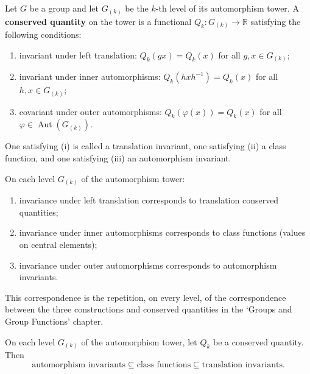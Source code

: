 \begin{definition}\label{def:higher_conservation_law}
Let $G$ be a group and let $G_{(k)}$ be the $k$-th level of its automorphism tower. A \textbf{conserved quantity} on the tower is a functional $Q_k: G_{(k)}\to \mathbb{R}$ satisfying the following conditions:
\begin{enumerate}[label=(\roman*)]
    \item invariant under left translation: $Q_k(gx)=Q_k(x)$ for all $g,x\in G_{(k)}$;
    \item invariant under inner automorphisms: $Q_k(hxh^{-1})=Q_k(x)$ for all $h,x\in G_{(k)}$;
    \item covariant under outer automorphisms: $Q_k(\varphi(x)) = Q_k(x)$ for all $\varphi\in\operatorname{Aut}(G_{(k)})$.
\end{enumerate}
One satisfying (i) is called a translation invariant, one satisfying (ii) a class function, and one satisfying (iii) an automorphism invariant.
\end{definition}

\begin{remark}\label{cor:higher_conservation}
On each level $G_{(k)}$ of the automorphism tower:
\begin{enumerate}[label=(\roman*)]
    \item invariance under left translation corresponds to translation conserved quantities;
    \item invariance under inner automorphisms corresponds to class functions (values on central elements);
    \item invariance under outer automorphisms corresponds to automorphism invariants.
\end{enumerate}
This correspondence is the repetition, on every level, of the correspondence between the three constructions and conserved quantities in the `Groups and Group Functions' chapter.
\end{remark}

\begin{property}\label{prop:tower_conservation_inclusion}
On each level $G_{(k)}$ of the automorphism tower, let $Q_k$ be a conserved quantity. Then
\[
\text{automorphism invariants} \subseteq \text{class functions} \subseteq \text{translation invariants}.
\]
\end{property}

